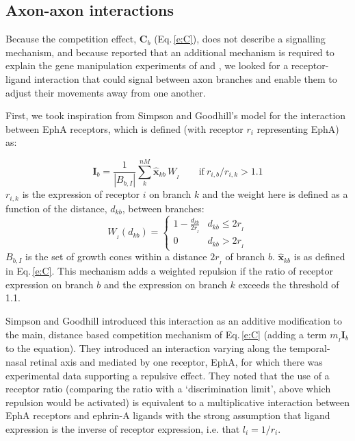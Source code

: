 \documentclass[11pt, a4paper]{article}
\begin{document}
\subsection*{Axon-axon interactions}

Because the competition effect, $\mathbf{C}_b$ (Eq.\,\ref{e:C}), does not
describe a signalling mechanism, and because \citet{simpson_simple_2011}
reported that an additional mechanism is required to explain the gene
manipulation experiments of \citet{brown_topographic_2000}
and \citet{reber_relative_2004}, we looked for a receptor-ligand interaction
that could signal between axon branches and enable them to adjust their
movements away from one another.

First, we took inspiration from Simpson and Goodhill's model for the
interaction between EphA receptors, which is defined (with receptor $r_i$
representing EphA) as:

%
\begin{equation}
\mathbf{I}_b
= \frac{1}{|B_{b,I}|} \sum_k^{nM} \hat{\mathbf{x}}_{kb}\,W_{\!_I} \qquad \mathrm{if}~r_{i,b}
/ r_{i,k} > 1.1
\end{equation}
%
$r_{i,k}$ is the expression of receptor $i$ on branch $k$ and the weight here
is defined as a function of the distance, $d_{kb}$, between branches:
%
\begin{equation} \label{e:WI}
W_{\!_I}(d_{kb}) = \begin{cases}
      1 - \frac{d_{kb}}{2r_{\!_I}}   & d_{kb} \leq 2r_{\!_I} \\
     0 & d_{kb} > 2r_{\!_I}
     \end{cases}
\end{equation}
%
$B_{b,I}$ is the set of growth cones within a distance $2r_{\!_I}$ of branch
$b$. $\hat{\mathbf{x}}_{kb}$ is as defined in Eq.\,\ref{e:C}. This mechanism
adds a weighted repulsion if the ratio of receptor expression on
branch $b$ and the expression on branch $k$ exceeds the threshold of 1.1.

Simpson and Goodhill introduced this interaction as an additive modification
to the main, distance based competition mechanism of Eq.\,\ref{e:C} (adding a
term $m_{\!_I} \mathbf{I}_b$ to the equation). They introduced an interaction
varying along the temporal-nasal retinal axis and mediated by one receptor,
EphA, for which there was experimental data supporting a repulsive
effect. They noted that the use of a receptor ratio (comparing the ratio with
a `discrimination limit', above which repulsion would be activated) is
equivalent to a multiplicative interaction between EphA receptors and ephrin-A
ligands with the strong assumption that ligand expression is the inverse of
receptor expression, i.e. that $l_i = 1/r_i$.
\end{document}
